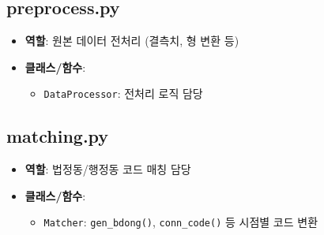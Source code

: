 \documentclass{article}
\begin{document}
\subsection{preprocess.py}
\begin{itemize}
    \item \textbf{역할}: 원본 데이터 전처리 (결측치, 형 변환 등)
    \item \textbf{클래스/함수}:
    \begin{itemize}
        \item \texttt{DataProcessor}: 전처리 로직 담당
    \end{itemize}
\end{itemize}

\subsection{matching.py}
\begin{itemize}
    \item \textbf{역할}: 법정동/행정동 코드 매칭 담당
    \item \textbf{클래스/함수}:
    \begin{itemize}
        \item \texttt{Matcher}:
              \texttt{gen\_bdong()}, \texttt{conn\_code()} 등 시점별 코드 변환
    \end{itemize}
\end{itemize}
\end{document}
